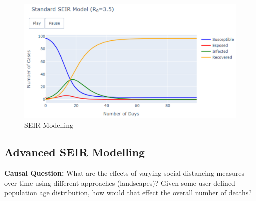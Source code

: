 \begin{figure}[ht!]%
    \centering
    \includegraphics[width=0.85\linewidth]{latex/images/seir.pdf}
    \caption{SEIR Modelling}
    \label{seir}
\end{figure}

\subsection{Advanced SEIR Modelling}
\label{cov_model}

\textbf{Causal Question:} What are the effects of varying social distancing measures over time using different approaches (landscapes)? Given some user defined population age distribution, how would that effect the overall number of deaths?

